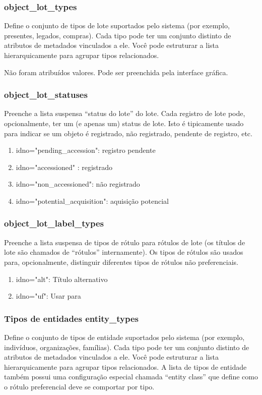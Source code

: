 \subsubsection{object\_lot\_types}
Define o conjunto de tipos de lote suportados pelo sistema (por exemplo, presentes, legados, compras). Cada tipo pode ter um conjunto distinto de atributos de metadados vinculados a ele. Você pode estruturar a lista hierarquicamente para agrupar tipos relacionados.

Não foram atribuídos valores. Pode ser preenchida pela interface gráfica.

\subsubsection{object\_lot\_statuses}
Preenche a lista suspensa ``status do lote'' do lote. Cada registro de lote pode, opcionalmente, ter um (e apenas um) status de lote. Isto é tipicamente usado para indicar se um objeto é registrado, não registrado, pendente de registro, etc.

\begin{enumerate}
	\item idno="pending\_accession": registro pendente
	\item idno="accessioned" : registrado
	\item idno="non\_accessioned": não registrado
	\item idno="potential\_acquisition": aquisição potencial
\end{enumerate}

\subsubsection{object\_lot\_label\_types}
Preenche a lista suspensa de tipos de rótulo para rótulos de lote (os títulos de lote são chamados de ``rótulos'' internamente). Os tipos de rótulos são usados para, opcionalmente, distinguir diferentes tipos de rótulos não preferenciais.

\begin{enumerate}
	\item idno="alt": Título alternativo
	\item idno="uf": Usar para
\end{enumerate}

\subsubsection{Tipos de entidades entity\_types}
Define o conjunto de tipos de entidade suportados pelo sistema (por exemplo, indivíduos, organizações, famílias). Cada tipo pode ter um conjunto distinto de atributos de metadados vinculados a ele. Você pode estruturar a lista hierarquicamente para agrupar tipos relacionados. A lista de tipos de entidade também possui uma configuração especial chamada ``entity class'' que define como o rótulo preferencial deve se comportar por tipo.

